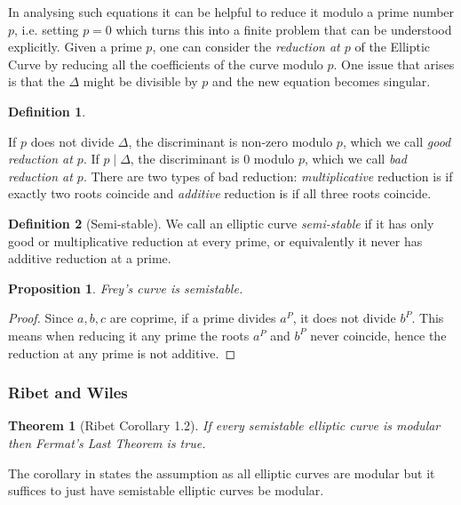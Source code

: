 \documentclass{article}
\newtheorem{thm}{Theorem}[section]
\newtheorem{prop}{Proposition}[section]
\theoremstyle{definition}
\newtheorem{definition}{Definition}[section]
\theoremstyle{definition}
\theoremstyle{definition}
\begin{document}
In analysing such equations it can be helpful to reduce it modulo a prime number $p$, i.e. setting $p=0$ which turns this into a finite problem that can be understood explicitly.
Given a prime $p$, one can consider the \emph{reduction at $p$} of the Elliptic Curve by reducing all the coefficients of the curve modulo $p$. 
One issue that arises is that the $\Delta$ might be divisible by $p$ and the new equation becomes singular.

\begin{definition}\label{reduction}
    
If $p$ does not divide $\Delta$,  the discriminant is non-zero modulo $p$, which we call \emph{good reduction at $p$}. If $p \mid \Delta$,  the discriminant is $0$ modulo $p$, which we call \emph{bad reduction at $p$}. There are two types of bad reduction: \emph{multiplicative} reduction is if exactly two roots coincide and \emph{additive} reduction is if all three roots coincide.

\end{definition}
\begin{definition} [Semi-stable]
We call an elliptic curve \emph{semi-stable} if it has only good or multiplicative reduction at every prime, or equivalently it never has additive reduction at a prime.
\end{definition}


\begin{prop}
    Frey's curve is semistable.
\end{prop}
\begin{proof}
    Since $a,b,c$ are coprime, if a prime divides $a^P$, it does not divide $b^P$. This means when reducing it any prime the roots $a^P$ and $b^P$ never coincide, hence the reduction at any prime is not additive.
\end{proof}



\subsubsection{Ribet and Wiles}
\begin{thm}[Ribet \cite{Ribet} Corollary 1.2]
     If every semistable elliptic curve is modular then Fermat's Last Theorem is true.
\end{thm} 

The corollary in \cite{Ribet} states the assumption as all elliptic curves are modular but it suffices to just have semistable elliptic curves be modular.
\end{document}
